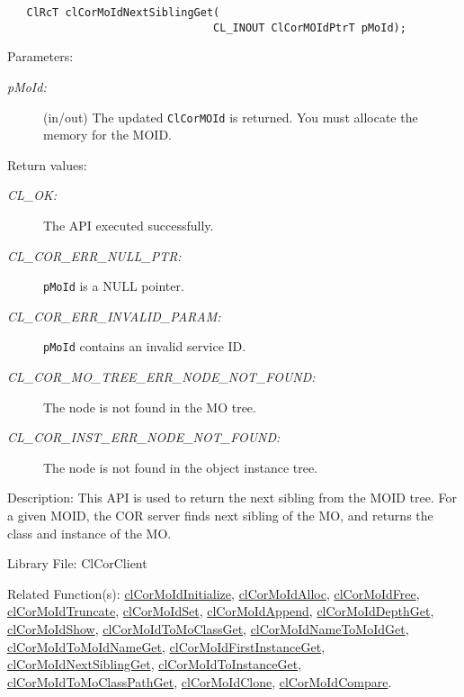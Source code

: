 \begin{flushleft}
\begin{Desc}
\footnotesize\begin{verbatim}   ClRcT clCorMoIdNextSiblingGet(
                         		CL_INOUT ClCorMOIdPtrT pMoId);
\end{verbatim}
\normalsize
\end{Desc}
\begin{Desc}
\item[Parameters:]
\begin{description}
\item[{\em p\-MoId:}](in/out) The updated {\tt{ClCorMOId}} is returned. You must allocate the memory for the MOID.\end{description}
\end{Desc}
\begin{Desc}
\item[Return values:]
\begin{description}
\item[{\em CL\_\-OK:}]The API executed successfully.
\item[{\em CL\_\-COR\_\-ERR\_\-NULL\_\-PTR:}] {\tt{pMoId}} is a NULL pointer.
\item[{\em CL\_\-COR\_\-ERR\_\-INVALID\_\-PARAM:}] {\tt{pMoId}} contains an invalid service ID.
\item[{\em CL\_\-COR\_\-MO\_\-TREE\_\-ERR\_\-NODE\_\-NOT\_\-FOUND:}] The node is not found in the MO tree.
\item[{\em CL\_\-COR\_\-INST\_\-ERR\_\-NODE\_\-NOT\_\-FOUND:}] The node is not found in the object instance tree.

\end{description}
\end{Desc}
\begin{Desc}
\item[Description:]This API is used to return the next sibling from the MOID tree. For a given MOID, the COR server finds next 
sibling of the MO, and returns the class and instance of the MO.
\end{Desc}
\begin{Desc}
\item[Library File:]Cl\-Cor\-Client\end{Desc}
\begin{Desc}
\item[Related Function(s):]\hyperlink{pagecor100}{cl\-Cor\-MoId\-Initialize}, \hyperlink{pagecor113}{cl\-Cor\-MoId\-Alloc}, 
\hyperlink{pagecor114}{cl\-Cor\-MoId\-Free},
\hyperlink{pagecor115}{cl\-Cor\-MoId\-Truncate}, 
\hyperlink{pagecor116}{cl\-Cor\-MoId\-Set}, 
\hyperlink{pagecor117}{cl\-Cor\-MoId\-Append}, 
\hyperlink{pagecor118}{cl\-Cor\-MoId\-Depth\-Get}, 
\hyperlink{pagecor119}{cl\-Cor\-MoId\-Show}, 
\hyperlink{pagecor120}{cl\-Cor\-MoId\-To\-Mo\-Class\-Get}, 
\hyperlink{pagecor121}{cl\-Cor\-MoId\-Name\-To\-MoId\-Get}, 
\hyperlink{pagecor122}{cl\-Cor\-MoId\-To\-MoId\-Name\-Get}, 
\hyperlink{pagecor123}{cl\-Cor\-MoId\-First\-Instance\-Get},
\hyperlink{pagecor124}{cl\-Cor\-MoId\-Next\-Sibling\-Get}, 
\hyperlink{pagecor125}{cl\-Cor\-MoId\-To\-Instance\-Get}, 
\hyperlink{pagecor126}{cl\-Cor\-MoId\-To\-Mo\-Class\-Path\-Get}, 
\hyperlink{pagecor127}{cl\-Cor\-MoId\-Clone}, 
\hyperlink{pagecor128}{cl\-Cor\-MoId\-Compare}.\end{Desc}
\newpage



\end{flushleft}
